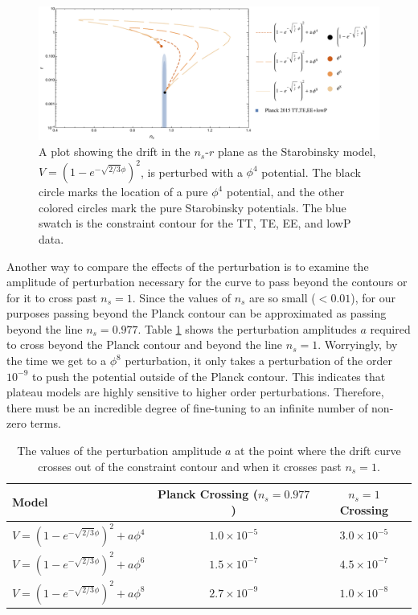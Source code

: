 \documentclass[a4paper,11pt]{article}
\def\nsr{$n_s$-$r$ }
\begin{document}
\begin{figure}[h!]
	\centering
	\includegraphics[width=\textwidth]{figures/LFP_lines_Rsq_varyaf_final.pdf}
	\caption[Drift in \nsr plane for Starobinsky model with perturbations.]{A plot showing the drift in the \nsr plane as the Starobinsky model, $V=(1-e^{-\sqrt{2/3}\phi})^2$, is perturbed with a $\phi^4$ potential. The black circle marks the location of a pure $\phi^4$ potential, and the other colored circles mark the pure Starobinsky potentials. The blue swatch is the \citet{Planck2015} constraint contour for the TT, TE, EE, and lowP data.}
	\label{fig:LFP_Rsq_drift_af}
\end{figure}

Another way to compare the effects of the perturbation is to examine the amplitude of perturbation necessary for the curve to pass beyond the \citet{Planck2015} contours or for it to cross past $n_s=1$. Since the values of $n_s$ are so small ($<0.01$), for our purposes passing beyond the Planck contour can be approximated as passing beyond the line $n_s=0.977$. Table \ref{tab:crossings_vary_af} shows the perturbation amplitudes $a$ required to cross beyond the Planck contour and beyond the line $n_s=1$. Worryingly, by the time we get to a $\phi^8$ perturbation, it only takes a perturbation of the order $10^{-9}$ to push the potential outside of the Planck contour. This indicates that plateau models are highly sensitive to higher order perturbations. Therefore, there must be an incredible degree of fine-tuning to an infinite number of non-zero terms. 

\begin{table}[htbp]
   \centering
   \begin{tabular}{@{} l  c  c @{}} %
      \toprule
      Model & Planck Crossing ($n_s=0.977$) &  $n_s=1$ Crossing \\
      \midrule
      $V=(1-e^{-\sqrt{2/3}\phi})^2 + a\phi^4$ & $1.0\times10^{-5}$ & $3.0\times10^{-5}$ \\
       $V=(1-e^{-\sqrt{2/3}\phi})^2 + a\phi^6$ & $1.5\times10^{-7}$ & $4.5\times10^{-7}$ \\
       $V=(1-e^{-\sqrt{2/3}\phi})^2 + a\phi^8$ & $2.7\times10^{-9}$ & $1.0\times10^{-8}$ \\
      \bottomrule
   \end{tabular}
   \caption{The values of the perturbation amplitude $a$ at the point where the drift curve crosses out of the \citet{Planck2015} constraint contour and when it crosses past $n_s=1$.}
   \label{tab:crossings_vary_af}
\end{table}
\end{document}
